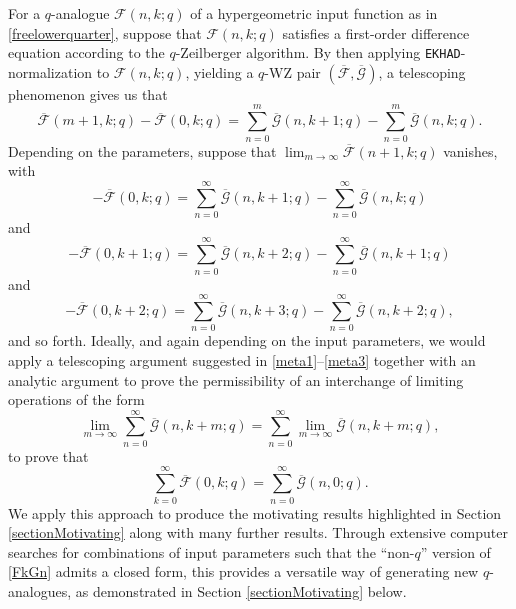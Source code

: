 \documentclass[12pt]{article}
\begin{document}
 For a $q$-analogue $\mathcal{F}(n, k; q)$ of a hypergeometric input function as in 
 \eqref{freelowerquarter}, 
 suppose that $\mathcal{F}(n, k; q)$ satisfies a first-order difference equation according
 to the $q$-Zeilberger algorithm.
 By then applying {\tt EKHAD}-normalization to $\mathcal{F}(n, k; q)$, 
 yielding a $q$-WZ pair $(\overline{\mathcal{F}}, \overline{\mathcal{G}})$, a telescoping phenomenon gives us that 
\begin{equation*}
 \overline{\mathcal{F}}(m+1, k; q) - \overline{\mathcal{F}}(0, k; q) = \sum_{n=0}^{m} \overline{\mathcal{G}}(n, k+1; q) - \sum_{n=0}^{m} \overline{\mathcal{G}}(n, k; q). 
\end{equation*}
 Depending on the parameters, 
 suppose that $\lim_{m \to \infty} \overline{\mathcal{F}}(n+1,k;q)$ vanishes, with 
\begin{equation}\label{meta1}
 - \overline{\mathcal{F}}(0, k; q) = \sum_{n=0}^{\infty} \overline{\mathcal{G}}(n, k+1; q) - \sum_{n=0}^{\infty} \overline{\mathcal{G}}(n, k; q) 
\end{equation}
 and 
\begin{equation}\label{meta2}
 - \overline{\mathcal{F}}(0, k+1; q) = \sum_{n=0}^{\infty} \overline{\mathcal{G}}(n, k+2; q) - \sum_{n=0}^{\infty} \overline{\mathcal{G}}(n, k+1; q) 
\end{equation}
 and 
\begin{equation}\label{meta3}
 - \overline{\mathcal{F}}(0, k+2; q) = 
 \sum_{n=0}^{\infty} \overline{\mathcal{G}}(n, k+3; q) - \sum_{n=0}^{\infty} \overline{\mathcal{G}}(n, k+2; q), 
\end{equation}
 and so forth. Ideally, and again 
 depending on the input parameters, 
 we would apply a telescoping argument 
 suggested in 
 \eqref{meta1}--\eqref{meta3} together with 
 an analytic argument to prove the permissibility of an interchange of limiting operations of the form 
 $$\lim_{m \to \infty} \sum_{n=0}^{\infty} \overline{\mathcal{G}}(n,k+m;q) = 
 \sum_{n=0}^{\infty} \lim_{m \to \infty} \overline{\mathcal{G}}(n,k+m;q),$$ 
 to prove that 
\begin{equation}\label{FkGn}
 \sum_{k=0}^{\infty} \overline{\mathcal{F}}(0, k;q) = \sum_{n=0}^{\infty} \overline{\mathcal{G}}(n,0;q). 
\end{equation}
 We apply this approach 
 to produce the motivating results highlighted in Section \ref{sectionMotivating}
 along with many further results. 
 Through extensive computer searches for combinations of input parameters such that 
 the ``non-$q$'' version of \eqref{FkGn}
 admits a closed form, 
 this provides a versatile way of
 generating new $q$-analogues, as demonstrated in Section 
 \ref{sectionMotivating} below. 
\end{document}
